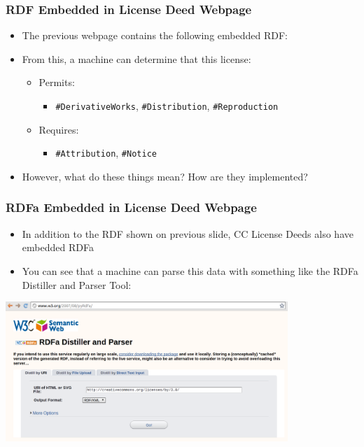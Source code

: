 \documentclass[mathserif,xcolor=dvipsnames,hyperref={bookmarks=true}]{beamer}
\begin{document}
\begin{frame}[fragile]
\frametitle{RDF Embedded in License Deed Webpage}
        \begin{itemize}
            \item The previous webpage contains the following embedded RDF:
        \end{itemize}

        \begin{itemize}
            \item From this, a machine can determine that this license:
            \begin{itemize}
                \item Permits:
                    \begin{itemize}
                        \item \texttt{\#DerivativeWorks}, \texttt{\#Distribution}, \texttt{\#Reproduction}
                    \end{itemize}
                \item Requires:
                    \begin{itemize}
                        \item \texttt{\#Attribution}, \texttt{\#Notice}
                    \end{itemize}
            \end{itemize}
            \item However, what do these things mean?  How are they implemented?
        \end{itemize}
\end{frame}

\begin{frame}[t]
\frametitle{RDFa Embedded in License Deed Webpage}
        \begin{itemize}
            \item In addition to the RDF shown on previous slide, CC License Deeds also have embedded RDFa
            \item You can see that a machine can parse this data with something
            like the RDFa Distiller and Parser Tool:
        \end{itemize}
        \begin{center}
            \includegraphics[width=0.8\textwidth]{RDFa-distiller.png}
        \end{center}
\end{frame}
\end{document}
